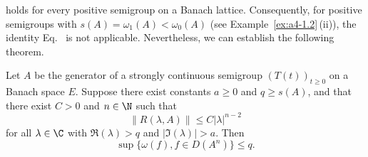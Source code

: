holds for every positive semigroup on a Banach lattice. 
Consequently, for positive semigroups with $s(A) = \omega_1(A) < \omega_{0}(A)$ (see Example~\ref{ex:a4-1.2}\,(ii)), the identity Eq.~ is not applicable. 
Nevertheless, we can establish the following theorem.
\begin{theorem}\label{thm:a4-1.9}
Let $A$ be the generator of a strongly continuous semigroup $(T(t))_{t \geq 0}$ on a Banach space $E$. 
Suppose there exist constants $a \geq 0$ and $q \geq s(A)$, and that there exist $C > 0$ and $n \in \N$ such that 
\[
    \| R(\lambda, A) \| \leq C | \lambda |^{n-2}
\]
for all $\lambda \in \C$ with $\Re(\lambda) > q$ and $| \Im(\lambda) | > a$. 
Then
\[
    \sup \{ \omega(f),  f \in D(A^n) \} \leq q.
\]
\end{theorem}
